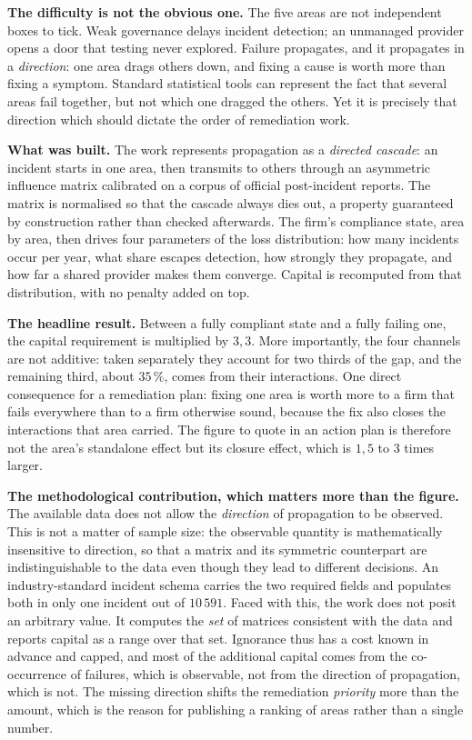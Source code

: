 \documentclass[12pt,a4paper]{article}
\theoremstyle{definition}
\begin{document}
\textbf{The difficulty is not the obvious one.} The five areas are not independent
boxes to tick. Weak governance delays incident detection; an unmanaged provider
opens a door that testing never explored. Failure propagates, and it propagates in
a \emph{direction}: one area drags others down, and fixing a cause is worth more
than fixing a symptom. Standard statistical tools can represent the fact that
several areas fail together, but not which one dragged the others. Yet it is
precisely that direction which should dictate the order of remediation work.

\textbf{What was built.} The work represents propagation as a \emph{directed
cascade}: an incident starts in one area, then transmits to others through an
asymmetric influence matrix calibrated on a corpus of official post-incident
reports. The matrix is normalised so that the cascade always dies out, a property
guaranteed by construction rather than checked afterwards. The firm's compliance
state, area by area, then drives four parameters of the loss distribution: how
many incidents occur per year, what share escapes detection, how strongly they
propagate, and how far a shared provider makes them converge. Capital is recomputed
from that distribution, with no penalty added on top.

\textbf{The headline result.} Between a fully compliant state and a fully failing
one, the capital requirement is multiplied by $3{,}3$. More importantly, the four
channels are not additive: taken separately they account for two thirds of the gap,
and the remaining third, about $35\,\%$, comes from their interactions. One direct
consequence for a remediation plan: fixing one area is worth more to a firm that
fails everywhere than to a firm otherwise sound, because the fix also closes the
interactions that area carried. The figure to quote in an action plan is therefore
not the area's standalone effect but its closure effect, which is $1{,}5$ to $3$
times larger.

\textbf{The methodological contribution, which matters more than the figure.} The
available data does not allow the \emph{direction} of propagation to be observed.
This is not a matter of sample size: the observable quantity is mathematically
insensitive to direction, so that a matrix and its symmetric counterpart are
indistinguishable to the data even though they lead to different decisions. An
industry-standard incident schema carries the two required fields and populates
both in only one incident out of $10\,591$. Faced with this, the work does not
posit an arbitrary value. It computes the \emph{set} of matrices consistent with
the data and reports capital as a range over that set. Ignorance thus has a cost
known in advance and capped, and most of the additional capital comes from the
co-occurrence of failures, which is observable, not from the direction of
propagation, which is not. The missing direction shifts the remediation
\emph{priority} more than the amount, which is the reason for publishing a ranking
of areas rather than a single number.
\end{document}
